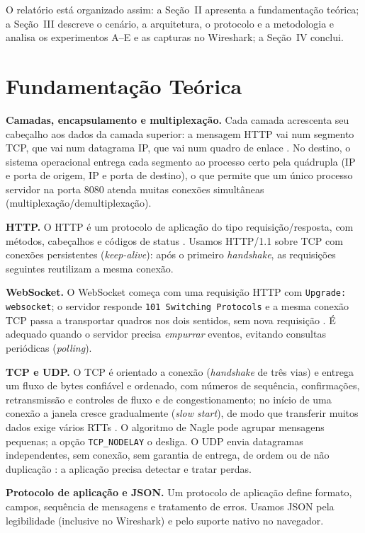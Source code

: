 \documentclass[conference]{IEEEtran}
\begin{document}
O relatório está organizado assim: a Seção~II apresenta a fundamentação teórica; a Seção~III descreve o cenário, a arquitetura, o protocolo e a metodologia e analisa os experimentos A--E e as capturas no Wireshark; a Seção~IV conclui.

\section{Fundamentação Teórica}
\textbf{Camadas, encapsulamento e multiplexação.} Cada camada acrescenta seu cabeçalho aos dados da camada superior: a mensagem HTTP vai num segmento TCP, que vai num datagrama IP, que vai num quadro de enlace \cite{kurose}. No destino, o sistema operacional entrega cada segmento ao processo certo pela quádrupla (IP e porta de origem, IP e porta de destino), o que permite que um único processo servidor na porta 8080 atenda muitas conexões simultâneas (multiplexação/demultiplexação).

\textbf{HTTP.} O HTTP é um protocolo de aplicação do tipo requisição/resposta, com métodos, cabeçalhos e códigos de status \cite{rfc9110}. Usamos HTTP/1.1 sobre TCP com conexões persistentes (\emph{keep-alive}): após o primeiro \emph{handshake}, as requisições seguintes reutilizam a mesma conexão.

\textbf{WebSocket.} O WebSocket começa com uma requisição HTTP com \texttt{Upgrade: websocket}; o servidor responde \texttt{101 Switching Protocols} e a mesma conexão TCP passa a transportar quadros nos dois sentidos, sem nova requisição \cite{rfc6455}. É adequado quando o servidor precisa \emph{empurrar} eventos, evitando consultas periódicas (\emph{polling}).

\textbf{TCP e UDP.} O TCP é orientado a conexão (\emph{handshake} de três vias) e entrega um fluxo de bytes confiável e ordenado, com números de sequência, confirmações, retransmissão e controles de fluxo e de congestionamento; no início de uma conexão a janela cresce gradualmente (\emph{slow start}), de modo que transferir muitos dados exige vários RTTs \cite{rfc9293,kurose}. O algoritmo de Nagle pode agrupar mensagens pequenas; a opção \texttt{TCP\_NODELAY} o desliga. O UDP envia datagramas independentes, sem conexão, sem garantia de entrega, de ordem ou de não duplicação \cite{rfc768}: a aplicação precisa detectar e tratar perdas.

\textbf{Protocolo de aplicação e JSON.} Um protocolo de aplicação define formato, campos, sequência de mensagens e tratamento de erros. Usamos JSON \cite{rfc8259} pela legibilidade (inclusive no Wireshark) e pelo suporte nativo no navegador.
\end{document}
